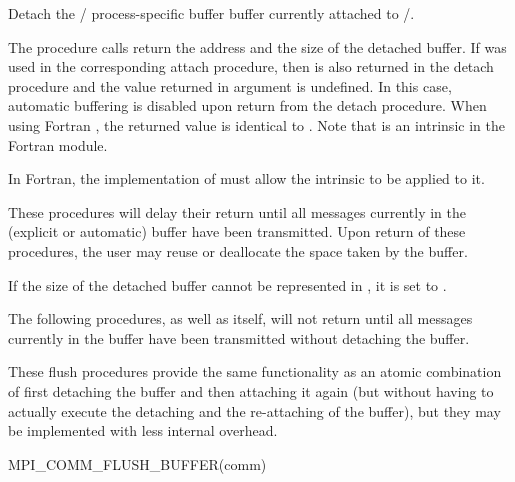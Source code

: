 Detach the \MPI/ process-specific buffer buffer currently attached to \MPI/.

The procedure calls return the
address and the size of the detached buffer.
If  was used in the corresponding attach procedure, then  is also returned in the detach procedure and the value returned in argument  is undefined.
In this case, automatic buffering is disabled upon return from the detach procedure.
When using Fortran , the returned value is identical to . Note that  is an intrinsic in the Fortran  module.
\begin{implementors}
In Fortran, the implementation of  must allow the intrinsic  to be applied to it.
\end{implementors}

These procedures
will delay their return until all messages currently in the (explicit or automatic) buffer have been transmitted.
Upon return of
these procedures, the user may reuse or deallocate the space taken by the buffer.

If the size of the detached buffer cannot be represented in
, it is set to .

\medskip %

The following  procedures, as well as  itself, will not return until all messages currently in the buffer have been transmitted without detaching the buffer.

\begin{rationale}
These flush procedures provide the same functionality as an atomic combination of first detaching the buffer and then attaching it again (but without having to actually execute the detaching and the re-attaching of the buffer), but they may be implemented with less internal overhead.
\end{rationale}

\begin{funcdef}{MPI\_COMM\_FLUSH\_BUFFER}{(\mbox{comm})}
\end{funcdef}

